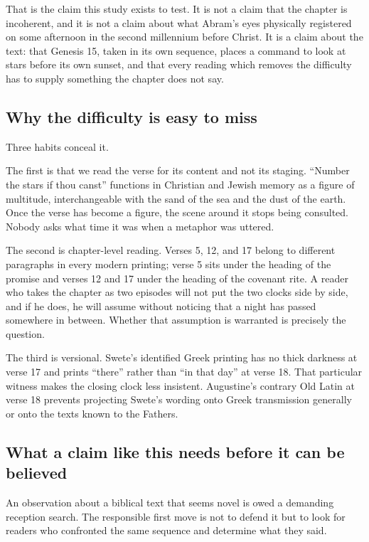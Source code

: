 That is the claim this study exists to test. It is not a claim that the
chapter is incoherent, and it is not a claim about what Abram's eyes physically
registered on some afternoon in the second millennium before Christ. It is a
claim about the text: that Genesis 15, taken in its own sequence, places a
command to look at stars before its own sunset, and that every reading which
removes the difficulty has to supply something the chapter does not say.

\subsection{Why the difficulty is easy to miss}

Three habits conceal it.

The first is that we read the verse for its content and not its staging.
``Number the stars if thou canst'' functions in Christian and Jewish memory as a
figure of multitude, interchangeable with the sand of the sea and the dust of
the earth. Once the verse has become a figure, the scene around it stops being
consulted. Nobody asks what time it was when a metaphor was uttered.

The second is chapter-level reading. Verses 5, 12, and 17 belong to different
paragraphs in every modern printing; verse 5 sits under the heading of the
promise and verses 12 and 17 under the heading of the covenant rite. A reader who
takes the chapter as two episodes will not put the two clocks side by side, and
if he does, he will assume without noticing that a night has passed somewhere in
between. Whether that assumption is warranted is precisely the question.

The third is versional. Swete's identified Greek printing has no thick darkness
at verse 17 and prints ``there'' rather than ``in that day'' at verse 18. That
particular witness makes the closing clock less insistent. Augustine's contrary
Old Latin at verse 18 prevents projecting Swete's wording onto Greek
transmission generally or onto the texts known to the Fathers.

\subsection{What a claim like this needs before it can be believed}

An observation about a biblical text that seems novel is owed a demanding
reception search. The responsible first move is not to defend it but to look
for readers who confronted the same sequence and determine what they said.

